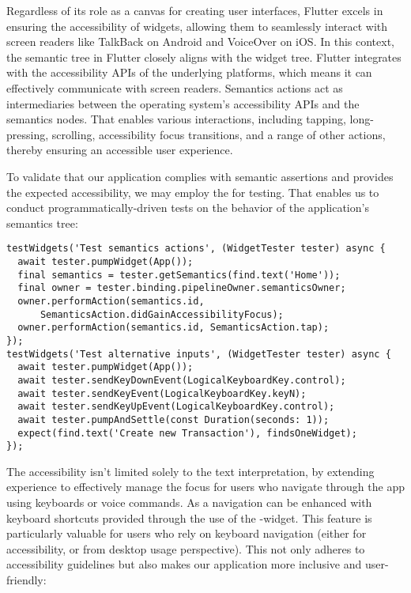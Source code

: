 \noindent Regardless of its role as a canvas for creating user interfaces, Flutter excels in ensuring the accessibility 
of widgets, allowing them to seamlessly interact with screen readers like TalkBack on Android and VoiceOver on iOS. In 
this context, the semantic tree in Flutter closely aligns with the widget tree. Flutter integrates with the 
accessibility APIs of the underlying platforms, which means it can effectively communicate with screen readers. 
Semantics actions act as intermediaries between the operating system's accessibility APIs and the semantics nodes. 
That enables various interactions, including tapping, long-pressing, scrolling, accessibility focus transitions, and a 
range of other actions, thereby ensuring an accessible user experience.

To validate that our application complies with semantic assertions and provides the expected accessibility, we may 
employ the  for testing. That enables us to conduct programmatically-driven tests on 
the behavior of the application's semantics tree:

\begin{lstlisting}
testWidgets('Test semantics actions', (WidgetTester tester) async {
  await tester.pumpWidget(App());
  final semantics = tester.getSemantics(find.text('Home'));
  final owner = tester.binding.pipelineOwner.semanticsOwner;
  owner.performAction(semantics.id,
      SemanticsAction.didGainAccessibilityFocus);
  owner.performAction(semantics.id, SemanticsAction.tap);
});
testWidgets('Test alternative inputs', (WidgetTester tester) async {
  await tester.pumpWidget(App());
  await tester.sendKeyDownEvent(LogicalKeyboardKey.control);
  await tester.sendKeyEvent(LogicalKeyboardKey.keyN);
  await tester.sendKeyUpEvent(LogicalKeyboardKey.control);
  await tester.pumpAndSettle(const Duration(seconds: 1));
  expect(find.text('Create new Transaction'), findsOneWidget);
});
\end{lstlisting}

\noindent The accessibility isn't limited solely to the text interpretation, by extending experience to effectively 
manage the focus for users who navigate through the app using keyboards or voice commands. As a navigation can be 
enhanced with keyboard shortcuts provided through the use of the -widget. This feature is particularly 
valuable for users who rely on keyboard navigation (either for accessibility, or from desktop usage perspective). This 
not only adheres to accessibility guidelines but also makes our application more inclusive and user-friendly:

